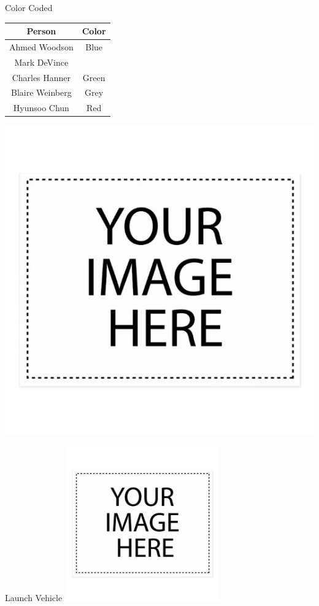 \documentclass[10pt]{beamer}
\begin{document}
	\begin{frame}{Color Coded}
		\begin{minipage}{0.4\textwidth}
			\begin{table}
				\begin{tabular}{|c|c|}\hline
					\textbf{Person} & \textbf{Color}\\ \hline
					Ahmed Woodson & Blue\\ \hline
					Mark DeVince & {}\\  \hline
					Charles Hanner & Green\\ \hline
					Blaire Weinberg & Grey\\  \hline
					Hyunsoo Chun & Red\\ \hline
				\end{tabular}
			\end{table}	
		\end{minipage}%
		\begin{minipage}{0.59\textwidth}
			\includegraphics[width=\textwidth]{Color_Coded.png}
		\end{minipage}
	\end{frame}
	\begin{frame}{Launch Vehicle}
		\includegraphics[width=0.5\textwidth]{Launch_Vehicle.png}
	\end{frame}
\end{document}
